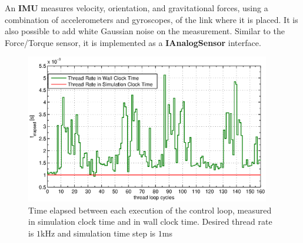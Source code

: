 An \textbf{IMU} measures velocity, orientation, and gravitational forces, using a combination of accelerometers and gyroscopes, of the link where it is placed. It is also possible to add white Gaussian noise on the measurement.
Similar to the Force/Torque sensor, it is implemented as a \textbf{IAnalogSensor} interface.
\begin{figure}
  \centering
    \includegraphics[height=6.5cm]{gfx/yarp_clock.eps}
    \caption{Time elapsed between each execution of the control loop, measured in simulation clock time and in wall clock time. Desired thread rate is $1$kHz and simulation time step is $1$ms}\label{yarp_clock_real_vs_simulated}
\end{figure}


